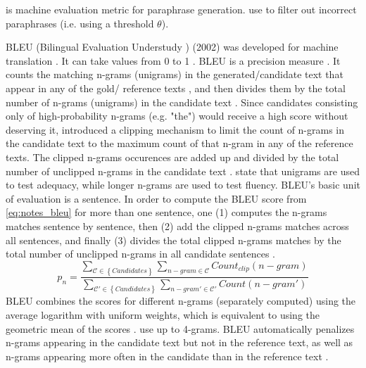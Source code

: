 \bluert{} is machine evaluation metric for paraphrase generation.
\citet{fu_learning_2024} use \bluert{} to filter out incorrect paraphrases (i.e. using a threshold $\theta$).

BLEU (Bilingual Evaluation Understudy \citep{palivela_optimization_2021,zhou_paraphrase_2025,papineni_bleu_2001}) (2002) 
was developed for machine translation \citep{zhou_paraphrase_2021,papineni_bleu_2001}.
It can take values from 0 to 1 \citep{papineni_bleu_2001}.
BLEU is a precision measure \citep{kurt_pehlivanoglu_comparative_2024,papineni_bleu_2001}.
It counts the matching n-grams (unigrams) in the generated/candidate text that appear in any of the gold/ reference texts \citep{palivela_optimization_2021,papineni_bleu_2001}, 
and then divides them by the total number of n-grams (unigrams) in the candidate text \citep{papineni_bleu_2001}.
Since candidates consisting only of high-probability n-grams (e.g. "the") would receive a high score without deserving it, 
\citet{papineni_bleu_2001} introduced a clipping mechanism to limit the count of n-grams in the candidate text to the maximum count of that n-gram in any of the reference texts.
The clipped n-grams occurences are added up and divided by the total number of unclipped n-grams in the candidate text \citep{papineni_bleu_2001}.
\citet{papineni_bleu_2001} state that unigrams are used to test adequacy, while longer n-grams are used to test fluency.
BLEU's basic unit of evaluation is a sentence. 
In order to compute the BLEU score from \autoref{eq:notes_bleu} for more than one sentence, one (1) computes the n-grams matches sentence by sentence, 
then (2) add the clipped n-grams matches across all sentences, 
and finally (3) divides the total clipped n-grams matches by the total number of unclipped n-grams in all candidate sentences \citep{papineni_bleu_2001}.
\begin{equation}
    p_n = \frac{\sum_{\mathcal{C} \in \left\{ Candidates \right\}}\sum_{n-gram \in\mathcal{C}}Count_{clip}(n-gram)}{\sum_{\mathcal{C'} \in \left\{ Candidates \right\}}\sum_{n-gram' \in\mathcal{C'}}Count(n-gram')}
\label{eq:notes_bleu}
\end{equation}
BLEU combines the scores for different n-grams (separately computed) using the average logarithm with uniform weights, 
which is equivalent to using the geometric mean of the scores \citep{papineni_bleu_2001,banerjee_METEOR_2005}.
\citet{gohsen_captions_2023} use up to 4-grams.
BLEU automatically penalizes n-grams appearing in the candidate text but not in the reference text, as well as n-grams appearing more often in the candidate than in the reference text \citep{papineni_bleu_2001}.
